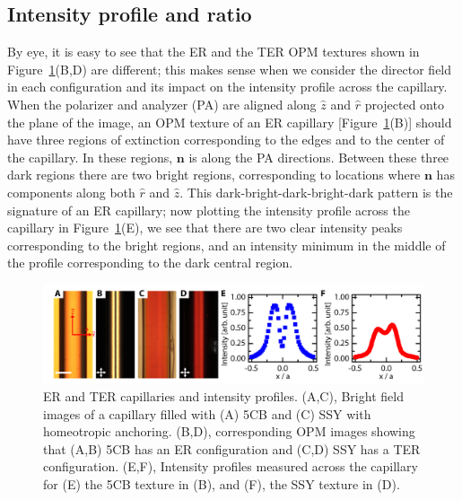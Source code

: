 \subsection{Intensity profile and ratio}
By eye, it is easy to see that the ER and the TER OPM textures shown in Figure~\ref{f:4-StraightCaps}(B,D) are different; this makes sense when we consider the director field in each configuration and its impact on the intensity profile across the capillary.
When the polarizer and analyzer (PA) are aligned along $\hat{z}$ and $\hat{r}$ projected onto the plane of the image, an OPM texture of an ER capillary [Figure~\ref{f:4-StraightCaps}(B)] should have three regions of extinction corresponding to the edges and  to the center of the capillary.
In these regions, $\mathbf{n}$ is along the PA directions.
Between these three dark regions there are two bright regions, corresponding to locations where $\mathbf{n}$ has components along both $\hat{r}$ and $\hat{z}$.
This dark-bright-dark-bright-dark pattern is the signature of an ER capillary; now plotting the intensity profile across the capillary in Figure~\ref{f:4-StraightCaps}(E), we see that there are two clear intensity peaks corresponding to the bright regions, and an intensity minimum in the middle of the profile corresponding to the dark central region.
\begin{figure}
  \centering
  \includegraphics{figures/C4/Ch4-Figs_StraightCaps.png}
  \caption{ER and TER capillaries and intensity profiles.
  (A,C), Bright field images of a capillary filled with (A) 5CB and (C) SSY with homeotropic anchoring.
  (B,D), corresponding OPM images showing that (A,B) 5CB has an ER configuration and (C,D) SSY has a TER configuration.
  (E,F), Intensity profiles measured across the capillary for (E) the 5CB texture in (B), and (F), the SSY texture in (D).}\label{f:4-StraightCaps}
\end{figure}

